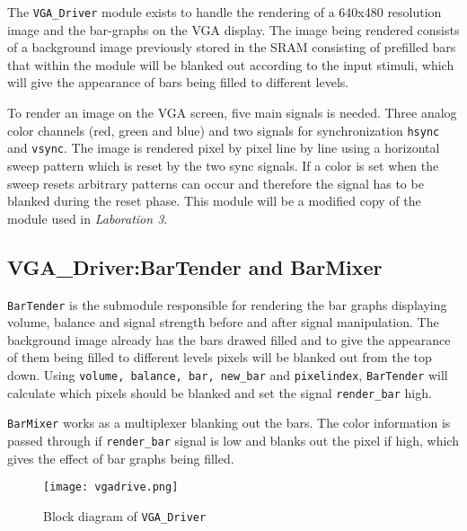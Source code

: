 The \verb+VGA_Driver+ module exists to handle the rendering of a 640x480 resolution image and the bar-graphs on the VGA display. The image being rendered consists of a background image previously stored in the SRAM consisting of prefilled bars that within the module will be blanked out according to the input stimuli, which will give the appearance of bars being filled to different levels.   

To render an image on the VGA screen, five main signals is needed. Three analog color channels (red, green and blue) and two signals for synchronization \verb=hsync= and \verb=vsync=. The image is rendered pixel by pixel line by line using a horizontal sweep pattern which is reset by the two sync signals. If a color is set when the sweep resets arbitrary patterns can occur and therefore the signal has to be blanked during the reset phase. This module will be a modified copy of the module used in \emph{Laboration 3}.


\subsection{VGA\_Driver:BarTender and BarMixer}\label{sec:BarTender}
\verb+BarTender+ is the submodule responsible for rendering the bar graphs displaying volume, balance and signal strength before and after signal manipulation. The background image already has the bars drawed filled and to give the appearance of them being filled to different levels pixels will be blanked out from the top down. Using \verb=volume, balance, bar, new_bar= and \verb=pixelindex=, \verb+BarTender+ will calculate which pixels should be blanked and set the signal \verb=render_bar= high.

\verb+BarMixer+ works as a multiplexer blanking out the bars. The color information is passed through if \verb=render_bar= signal is low and blanks out the pixel if high, which gives the effect of bar graphs being filled.


\begin{figure}[h]
        \centering
        \texttt{[image: vgadrive.png]} 
        \caption{Block diagram of \texttt{VGA\_Driver}}
        \label{fig:VGAdrive}
\end{figure}



